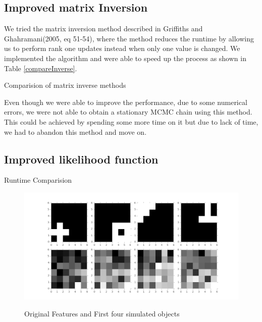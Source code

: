 \documentclass{article}
\begin{document}

\subsection{Improved matrix Inversion}
We tried the matrix inversion method described in Griffiths and Ghahramani(2005, eq 51-54), where the method reduces the runtime by allowing us to perform rank one updates instead when only one value is changed. We implemented the algorithm and were able to speed up the process as shown in Table \ref{compareInverse}.

\begin{table}[ht]
\centering
\caption{Comparision of matrix inverse methods \label{compareInverse}}

\end{table}

Even though we were able to improve the performance, due to some numerical errors, we were not able to obtain a stationary MCMC chain using this method. This could be achieved by spending some more time on it but due to lack of time, we had to abandon this method and move on.

\subsection{Improved likelihood function}



\begin{table}[ht]
\centering
\caption{Runtime Comparision \label{runtimes}}


\end{table}



\begin{figure}
\caption {Original Features and First four simulated objects}
\includegraphics[width=\linewidth]{figures/Original.png}
\label{fig:original}
\end{figure}
\end{document}
